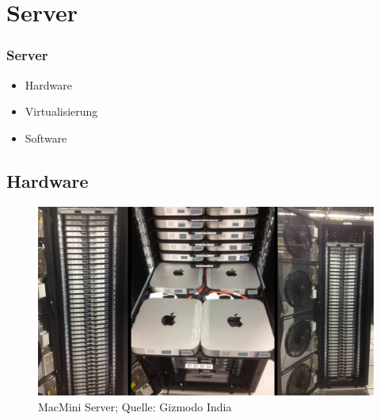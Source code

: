 \section{Server}
  \begin{frame}
      \frametitle<presentation>{Server}
      \begin{itemize}
        \item Hardware
        \item Virtualisierung
       \item Software
    \end{itemize}
  \end{frame}
    
  \subsection{Hardware}
    \begin{frame}
      \begin{figure}
      \begin{center}  
        \includegraphics[width=1\textwidth]{pics/MacMiniServer}
      \end{center}
      \caption{MacMini Server; Quelle: Gizmodo India}
    \end{figure}
    \end{frame}
      
